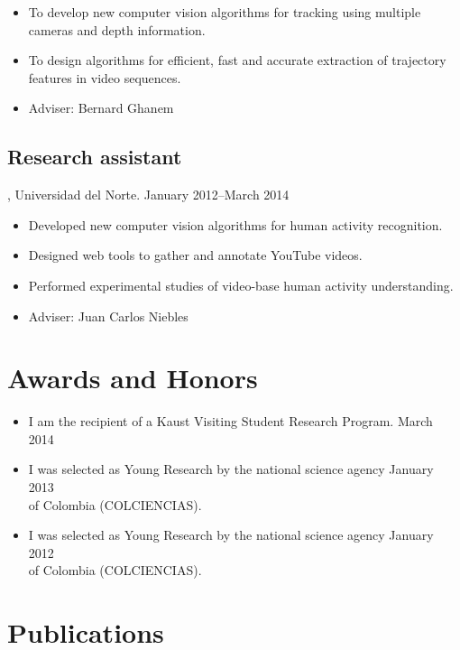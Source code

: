 \documentclass[letterpaper,10pt]{article}
\begin{document}
\begin{itemize}
  \item To develop new computer vision algorithms for tracking using multiple cameras and depth information.  
  \item To design algorithms for efficient, fast and accurate extraction of trajectory features in video sequences.  
  \item Adviser:  Bernard Ghanem
\end{itemize}

\subsection{Research assistant}, Universidad del Norte. \hfill January 2012--March 2014

\begin{itemize}
  \item Developed new computer vision algorithms for human activity recognition.
  \item Designed web tools to gather and annotate YouTube videos.
  \item Performed experimental studies of video-base human activity understanding.
  \item Adviser:  Juan Carlos Niebles
\end{itemize}

\section{Awards and Honors}

\begin{itemize}
  \item I am the recipient of a Kaust Visiting Student Research Program. \hfill March 2014
  \item I was selected as Young Research by the national science agency \hfill January 2013 \\
  of Colombia (COLCIENCIAS). 
  \item I was selected as Young Research by the national science agency \hfill January 2012 \\
  of Colombia (COLCIENCIAS).
\end{itemize}

\pagebreak


\section{Publications}
\end{document}
